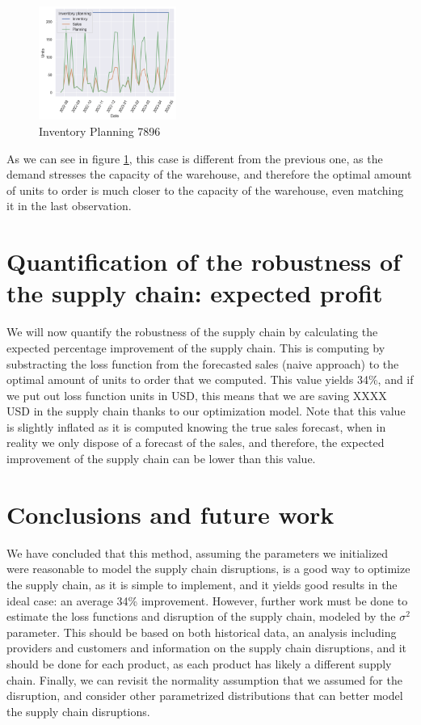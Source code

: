 \documentclass{OptiFlow}
\begin{document}
\begin{figure}[htpb]
	\centering
	\includegraphics[width=0.4\textwidth]{7896.png}
	\caption{Inventory Planning 7896}
	\label{fig:graf2}
\end{figure}

\vspace{-2mm}

As we can see in figure \ref{fig:graf2}, this case is different from the previous one, as the demand stresses the capacity of the warehouse,
and therefore the optimal amount of units to order is much closer to the capacity of the warehouse, even matching it in the last observation.

\section{Quantification of the robustness of the supply chain: expected profit}
We will now quantify the robustness of the supply chain by calculating the expected percentage improvement of the supply chain.
This is computing by substracting the loss function from the forecasted sales (naive approach) to the optimal amount of units to order that we computed.
This value yields 34\%, and if we put out loss function units in USD, this means that we are saving XXXX USD in the supply chain thanks to our optimization model.
Note that this value is slightly inflated as it is computed knowing the true sales forecast, when in reality
we only dispose of a forecast of the sales, and therefore, the expected improvement of the supply chain can be lower than this value.


\section{Conclusions and future work}
We have concluded that this method, assuming the parameters we initialized were reasonable to model the supply chain disruptions,
is a good way to optimize the supply chain, as it is simple to implement, and it yields good results in the ideal case: an average 34\% improvement.
However, further work must be done to estimate the loss functions and disruption of the supply chain,
modeled by the $\sigma^2$ parameter. This should be based on both historical data, an analysis including providers and customers
and information on the supply chain disruptions, and it should be done for each product, as each product has likely a different supply chain.
Finally, we can revisit the normality assumption that we assumed for the disruption, and consider other parametrized
distributions that can better model the supply chain disruptions.
\end{document}
